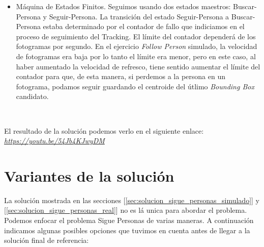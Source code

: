 \begin{itemize}
	\item Máquina de Estados Finitos. Seguimos usando dos estados maestros: Buscar-Persona y Seguir-Persona. La transición del estado Seguir-Persona a Buscar-Persona estaba determinado por el contador de fallo que indiciamos en el proceso de seguimiento del Tracking. El límite del contador dependerá de los fotogramas por segundo. En el ejercicio \textit{Follow Person} simulado, la velocidad de fotogramas era baja por lo tanto el límite era menor, pero en este caso, al haber aumentado la velocidad de refresco, tiene sentido aumentar el límite del contador para que, de esta manera, si perdemos a la persona en un fotograma, podamos seguir guardando el centroide del útlimo \textit{Bounding Box} candidato.
\end{itemize}\

El resultado de la solución podemos verlo en el siguiente enlace:\\
\textit{\url{https://youtu.be/54Jb4KJwyDM}}\\



\section{Variantes de la solución}
\label{sec:variantes_solucion}

La solución mostrada en las secciones [\ref{sec:solucion_sigue_personas_simulado}] y [\ref{sec:solucion_sigue_personas_real}] no es lá unica para abordar el problema. Podemos enfocar el problema Sigue Personas de varias maneras. A continuación indicamos algunas posibles opciones que tuvimos en cuenta antes de llegar a la solución final de referencia:\\

